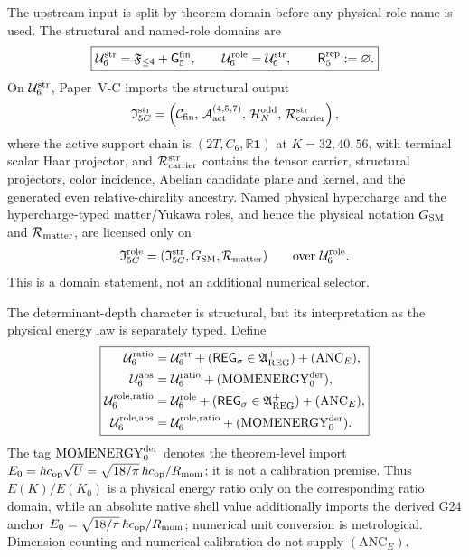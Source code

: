 \documentclass[12pt,a4paper]{article}
\newcommand{\Gfive}{\mathsf G_5^{\rm fin}}
\newcommand{\Rrep}{\mathsf R_5^{\rm rep}}
\newcommand{\REGsig}{\mathsf{REG}_{\sigma}}
\newcommand{\Ustr}{\mathcal U_6^{\rm str}}
\newcommand{\Urole}{\mathcal U_6^{\rm role}}
\newcommand{\Uratio}{\mathcal U_6^{\rm ratio}}
\newcommand{\Uabs}{\mathcal U_6^{\rm abs}}
\newcommand{\Uroleratio}{\mathcal U_6^{\rm role,ratio}}
\newcommand{\Uroleabs}{\mathcal U_6^{\rm role,abs}}
\newcommand{\Istr}{\mathfrak I_{5C}^{\rm str}}
\newcommand{\Irole}{\mathfrak I_{5C}^{\rm role}}
\begin{document}
The upstream input is split by theorem domain before any physical role name is
used.  The structural and named-role domains are
\begin{equation}
\label{p7v2:eq:upstream-package}
\boxed{
\Ustr=\mathfrak F_{\leq4}+\Gfive,
\qquad
\Urole=\Ustr,
\qquad
\Rrep:=\varnothing.
}
\end{equation}
On \(\Ustr\), Paper~V-C imports the structural output
\begin{equation}
\label{p7v2:eq:structural-import}
\Istr
=
\left(
 \mathcal C_{\rm fin},\,
 \mathcal A_{\rm act}^{(4,5,7)},\,
 \mathcal H_N^{\rm odd},\,
 \mathcal R_{\rm carrier}^{\rm str}
\right),
\end{equation}
where the active support chain is
\((2T,C_6,\mathbb R\mathbf1)\) at \(K=32,40,56\), with terminal scalar Haar
projector, and \(\mathcal R_{\rm carrier}^{\rm str}\) contains the tensor
carrier, structural projectors, color incidence, Abelian candidate plane and
kernel, and the generated even relative-chirality ancestry.  Named physical
hypercharge and the hypercharge-typed matter/Yukawa roles, and hence the
physical notation \(G_{\rm SM}\) and \(\mathcal R_{\rm matter}\), are licensed only on
\begin{equation}
\label{p7v2:eq:physical-role-import}
\Irole=(\Istr,G_{\rm SM},\mathcal R_{\rm matter})
\qquad\text{over }\Urole.
\end{equation}
This is a domain statement, not an additional numerical selector.

The determinant-depth character is structural, but its interpretation as the
physical energy law is separately typed.  Define
\begin{equation}
\label{p7v2:eq:energy-import-domains}
\boxed{\begin{aligned}
\Uratio&=\Ustr+(\REGsig\in\mathfrak A_{\rm REG}^{+})
 +(\mathrm{ANC}_E),\\
\Uabs&=\Uratio+(\mathrm{MOMENERGY}_{0}^{\rm der}),\\
\Uroleratio&=\Urole+(\REGsig\in\mathfrak A_{\rm REG}^{+})
 +(\mathrm{ANC}_E),\\
\Uroleabs&=\Uroleratio+(\mathrm{MOMENERGY}_{0}^{\rm der}).
\end{aligned}}
\end{equation}
The tag \(\mathrm{MOMENERGY}_{0}^{\rm der}\) denotes the theorem-level import
\(E_0=\hbar c_{\rm op}\sqrt U=\sqrt{18/\pi}\,\hbar c_{\rm op}/R_{\rm mom}\); it is
not a calibration premise.
Thus \(E(K)/E(K_0)\) is a physical energy ratio only on the corresponding
ratio domain, while an absolute native shell value additionally imports the derived G24
anchor \(E_0=\sqrt{18/\pi}\,\hbar c_{\rm op}/R_{\rm mom}\); numerical unit conversion
is metrological.  Dimension counting and numerical calibration do
not supply \((\mathrm{ANC}_E)\).
\end{document}
